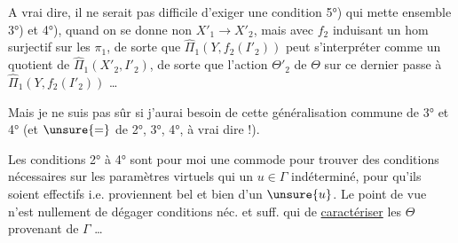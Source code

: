 A vrai dire, il ne serait pas difficile d'exiger une condition 5°) qui mette ensemble 3°) et 4°), quand on se donne non $X'_1\to X'_2$, mais
avec $f_2$  induisant un hom  surjectif sur les $\pi_1$, de sorte que $\widehat{\Pi}_1(Y,f_2(I'_2))$ peut s'interpréter comme un quotient de $\widehat{\Pi}_1(X'_2,I'_2)$, de sorte que l'action  $\Theta'_2$ de $\Theta$ sur ce dernier passe à $\widehat{\Pi}_1(Y,f_2(I'_2))$ \ldots

Mais je ne suis pas sûr si j'aurai besoin de cette généralisation commune de 3° et 4° (et $\unsure{=}$ de 2°, 3°, 4°, à vrai dire !).

Les conditions 2° à 4° sont pour moi  une \uline{} commode pour trouver des conditions nécessaires sur les paramètres virtuels qui  un $u\in\Gamma$ indéterminé, pour qu'ils soient effectifs i.e. proviennent bel et bien d'un $\unsure{u}$. Le point de vue  n'est nullement de dégager  conditions néc. et suff. qui  de \uline{caractériser} les $\Theta$ provenant de $\Gamma$ \ldots
{}
